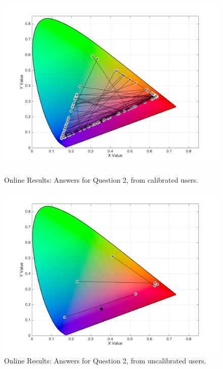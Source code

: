 \begin{figure}[!htbp]
  \centering
  \begin{minipage}{0.48\textwidth}
    \centering
    \includegraphics[width=\textwidth]{images/results/2_online_regularUsers.png}
    \caption[Online Results: Answers for Question 2, from calibrated users.]{Online Results: Answers for Question 2, from calibrated users.}
    \label{fig:uncal_1}
  \end{minipage}\hfill
  \begin{minipage}{0.48\textwidth}
    \centering
    \includegraphics[width=\textwidth]{images/results/2_online_uncalibratedUsers.png}
    \caption[Online Results: Answers for Question 2, from uncalibrated users.]{Online Results: Answers for Question 2, from uncalibrated users.}
    \label{fig:uncal_2}
  \end{minipage}
\end{figure} \par
